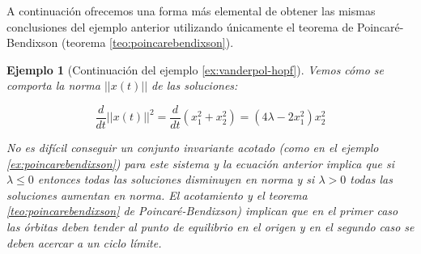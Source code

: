 \documentclass[11pt]{book}
\theoremstyle{definition}
\numberwithin{definition}{section}
\theoremstyle{theorem}
\numberwithin{theorem}{section}
\numberwithin{lemma}{section}
\numberwithin{corollary}{section}
\theoremstyle{plain}
\newtheorem{example}{Ejemplo}
\numberwithin{example}{section}
\begin{document}
A continuación ofrecemos una forma más elemental de obtener las mismas conclusiones del ejemplo anterior utilizando únicamente el teorema de Poincaré-Bendixson (teorema \ref{teo:poincarebendixson}).

\begin{example}[Continuación del ejemplo \ref{ex:vanderpol-hopf}]
Vemos cómo se comporta la norma $||x(t)||$ de las soluciones:

$$
	\dfrac{d}{dt} ||x(t)||^2 = \dfrac{d}{dt}(x_1^2 + x_2^2) = (4\lambda - 2x_1^2)x_2^2
$$

No es difícil conseguir un conjunto invariante acotado (como en el ejemplo \ref{ex:poincarebendixson}) para este sistema y la ecuación anterior implica que si $\lambda \leq 0$ entonces todas las soluciones disminuyen en norma y si $\lambda > 0$ todas las soluciones aumentan en norma.
El acotamiento y el teorema \ref{teo:poincarebendixson} de Poincaré-Bendixson) implican que en el primer caso las órbitas deben tender al punto de equilibrio en el origen y en el segundo caso se deben acercar a un ciclo límite.
\end{example}
\end{document}
